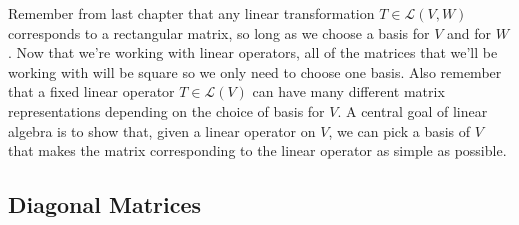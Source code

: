 \documentclass[12pt]{article}
\begin{document}
 Remember from last chapter that any linear transformation $T \in \mathcal{L} (V, W)$ corresponds to a rectangular matrix, so long as we choose a basis for $V$ and for $W$. Now that we're working with linear operators, all of the matrices that we'll be working with will be square so we only need to choose one basis. Also remember that a fixed linear operator $T \in \mathcal{L} (V)$ can have many different matrix representations depending on the choice of basis for $V$. A central goal of linear algebra is to show that, given a linear operator on $V$,  we can pick a basis of $V$ that makes the matrix corresponding to the linear operator as simple as possible.

\subsection*{Diagonal Matrices}
\end{document}
